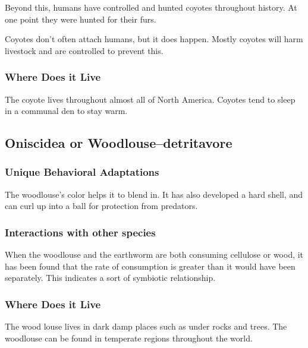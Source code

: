 \documentclass[paper=a4, fontsize=11pt]{article}
\begin{document}
Beyond this, humans have controlled and hunted coyotes throughout history. At one point
they were hunted for their furs.  

Coyotes don't often attach humans, but it does happen. Mostly coyotes will harm livestock and 
are controlled to prevent this.

\subsubsection{Where Does it Live}
The coyote lives throughout almost all of North America. Coyotes tend to sleep in a communal den to 
stay warm.

\subsection{Oniscidea or Woodlouse--detritavore}
\subsubsection{Unique Behavioral Adaptations}
The woodlouse's color helps it to blend in. It has also developed a hard shell, and can curl up into 
a ball for protection from predators.

\subsubsection{Interactions with other species}
When the woodlouse and the earthworm are both consuming cellulose or wood, it has been found that the
rate of consumption is greater than it would have been separately. This indicates a sort of 
symbiotic relationship. \cite{woodlice}

\subsubsection{Where Does it Live}
The wood louse lives in dark damp places such as under rocks and trees. The woodlouse can be found in 
 temperate regions throughout the world.


\end{document}
